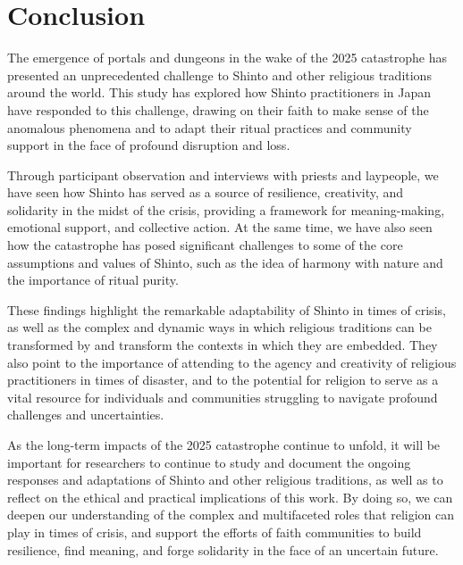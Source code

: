 \documentclass[12pt, a4paper]{article}
\begin{document}
\section{Conclusion}
The emergence of portals and dungeons in the wake of the 2025 catastrophe has presented an unprecedented challenge to Shinto and other religious traditions around the world. This study has explored how Shinto practitioners in Japan have responded to this challenge, drawing on their faith to make sense of the anomalous phenomena and to adapt their ritual practices and community support in the face of profound disruption and loss.

Through participant observation and interviews with priests and laypeople, we have seen how Shinto has served as a source of resilience, creativity, and solidarity in the midst of the crisis, providing a framework for meaning-making, emotional support, and collective action. At the same time, we have also seen how the catastrophe has posed significant challenges to some of the core assumptions and values of Shinto, such as the idea of harmony with nature and the importance of ritual purity.

These findings highlight the remarkable adaptability of Shinto in times of crisis, as well as the complex and dynamic ways in which religious traditions can be transformed by and transform the contexts in which they are embedded. They also point to the importance of attending to the agency and creativity of religious practitioners in times of disaster, and to the potential for religion to serve as a vital resource for individuals and communities struggling to navigate profound challenges and uncertainties.

As the long-term impacts of the 2025 catastrophe continue to unfold, it will be important for researchers to continue to study and document the ongoing responses and adaptations of Shinto and other religious traditions, as well as to reflect on the ethical and practical implications of this work. By doing so, we can deepen our understanding of the complex and multifaceted roles that religion can play in times of crisis, and support the efforts of faith communities to build resilience, find meaning, and forge solidarity in the face of an uncertain future.

\newpage



\end{document}
